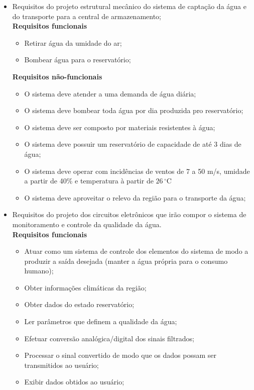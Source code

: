     \begin{itemize}
      \item Requisitos do projeto estrutural mecânico do sistema de captação da água e do transporte para a central de armazenamento;\\
	
	\textbf{Requisitos funcionais}
	  \begin{itemize}
	   \item Retirar água da umidade do ar;
	   \item Bombear água para o reservatório;
	  \end{itemize}
	  
	  \textbf{Requisitos não-funcionais}
	  \begin{itemize}
	    \item O sistema deve atender a uma demanda de água diária;
	    \item O sistema deve bombear toda água por dia produzida pro reservatório; 
	    \item O sistema deve ser composto por materiais resistentes à água;
	    \item O sistema deve possuir um reservatório de capacidade de até 3 dias de água;
	    \item O sistema deve operar com incidências de ventos de 7 a 50 m/s, umidade a partir de 40\% e 	temperatura à partir de $26\,^{\circ}\mathrm{C}$\cite{eole}
	    \item O sistema deve aproveitar o relevo da região para o transporte da água;

	  \end{itemize}
	
      \item Requisitos do projeto dos circuitos eletrônicos que irão compor o sistema de monitoramento e controle da qualidade da água.\\
	
	\textbf{Requisitos funcionais}
	\begin{itemize}
	  \item Atuar como um sistema de controle dos elementos do sistema de modo a produzir a saída desejada (manter a água própria para o consumo humano);
	  \item Obter informações climáticas da região;
	  \item Obter dados do estado reservatório;
	  \item Ler parâmetros que definem a qualidade da água;
	  \item Efetuar conversão analógica/digital dos sinais filtrados;
	  \item Processar o sinal convertido de modo que os dados possam ser transmitidos ao usuário;
	  \item Exibir dados obtidos ao usuário;
	\end{itemize}
	

\end{itemize}
